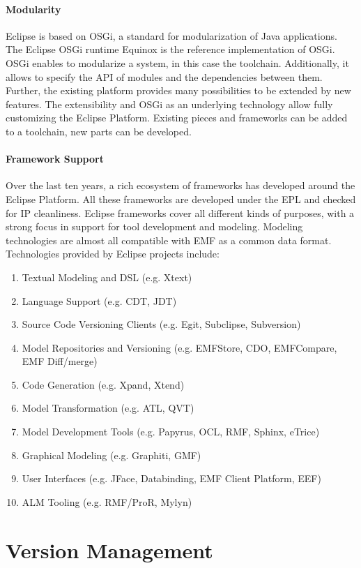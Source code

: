 \paragraph{Modularity}
Eclipse is based on OSGi, a standard for modularization of Java
applications. The Eclipse OSGi runtime Equinox is the reference
implementation of OSGi. OSGi enables to modularize a system, in this
case the toolchain. Additionally, it allows to specify the API of
modules and the dependencies between them. Further, the existing
platform provides many possibilities to be extended by new
features. The extensibility and OSGi as an underlying technology allow
fully customizing the Eclipse Platform. Existing pieces and frameworks
can be added to a toolchain, new parts can be developed.

\paragraph{Framework Support}
Over the last ten years, a rich ecosystem of frameworks has developed
around the Eclipse Platform. All these frameworks are developed under
the EPL and checked for IP cleanliness. Eclipse frameworks cover all
different kinds of purposes, with a strong focus in
support for tool development and modeling. Modeling technologies are
almost all compatible with EMF as a common data format. Technologies
provided by Eclipse projects include:
\begin{enumerate}
\item Textual Modeling and DSL (e.g. Xtext)
\item Language Support (e.g. CDT, JDT)
\item Source Code Versioning Clients (e.g. Egit, Subclipse, Subversion)
\item Model Repositories and Versioning (e.g. EMFStore, CDO, EMFCompare, EMF Diff/merge)
\item Code Generation (e.g. Xpand, Xtend)
\item Model Transformation (e.g. ATL, QVT)
\item Model Development Tools (e.g. Papyrus, OCL, RMF, Sphinx, eTrice)
\item Graphical Modeling (e.g. Graphiti, GMF)
\item User Interfaces (e.g. JFace, Databinding, EMF Client Platform, EEF)
\item ALM Tooling (e.g. RMF/ProR, Mylyn)
\end{enumerate}


\section{Version Management}

